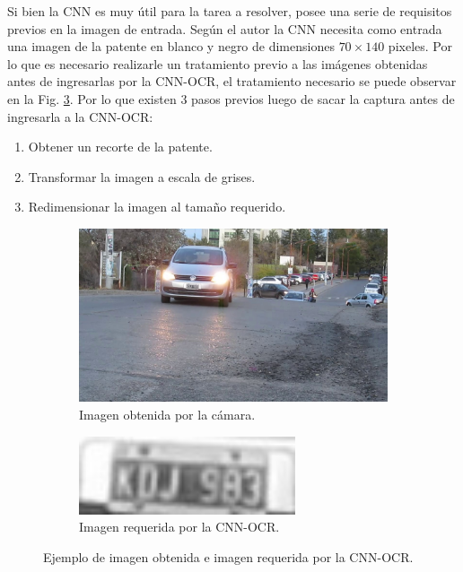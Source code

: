 Si bien la CNN es muy útil para la tarea a resolver, posee una serie de requisitos previos en la imagen de entrada. Según el autor la CNN 
necesita como entrada una imagen de la patente en blanco y negro de dimensiones $70 \times 140$ pixeles.
Por lo que es necesario realizarle un tratamiento previo a las imágenes obtenidas antes de ingresarlas por la CNN-OCR, el tratamiento necesario 
se puede observar en la Fig. \ref{fig:Comparativa-imagenes}. Por lo que existen 3 pasos previos luego de sacar 
la captura antes de ingresarla a la CNN-OCR:

\begin{enumerate}
    \item Obtener un recorte de la patente.
    \item Transformar la imagen a escala de grises.
    \item Redimensionar la imagen al tamaño requerido.
\end{enumerate}
\begin{figure}[!tbp]
    \centering
    \begin{subfigure}[b]{0.49\textwidth}
        \centering
        \includegraphics[width=\textwidth]{imgs/imagen-obtenida.jpg}
        \caption{Imagen obtenida por la cámara.}
        \label{fig:imagen-obtenida}
    \end{subfigure}
    \hfill
    \begin{subfigure}[b]{0.49\textwidth}
        \centering
        \includegraphics[width=0.7\textwidth]{imgs/imagen-requerida.jpg}
        \caption{Imagen requerida por la CNN-OCR.}
        \label{fig:imagen-requerida}
    \end{subfigure}
    \caption{Ejemplo de imagen obtenida e imagen requerida por la CNN-OCR.}
    \label{fig:Comparativa-imagenes}
\end{figure}

